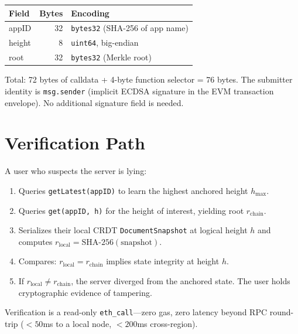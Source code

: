 \documentclass[11pt,a4paper]{article}
\begin{document}
\begin{center}
\begin{tabular}{lrl}
\toprule
\textbf{Field} & \textbf{Bytes} & \textbf{Encoding} \\
\midrule
appID  & 32 & \texttt{bytes32} (SHA-256 of app name) \\
height & 8  & \texttt{uint64}, big-endian \\
root   & 32 & \texttt{bytes32} (Merkle root) \\
\bottomrule
\end{tabular}
\end{center}

\noindent
Total: 72 bytes of calldata + 4-byte function selector = 76 bytes.
The submitter identity is \texttt{msg.sender} (implicit ECDSA signature
in the EVM transaction envelope). No additional signature field is needed.

\section{Verification Path}
\label{sec:verification}

A user who suspects the server is lying:

\begin{enumerate}[nosep]
  \item Queries \texttt{getLatest(appID)} to learn the highest anchored
        height $h_{\max}$.
  \item Queries \texttt{get(appID, h)} for the height of interest, yielding
        root $r_{\text{chain}}$.
  \item Serializes their local CRDT \texttt{DocumentSnapshot} at logical
        height $h$ and computes $r_{\text{local}} = \text{SHA-256}(\text{snapshot})$.
  \item Compares: $r_{\text{local}} = r_{\text{chain}}$ implies state
        integrity at height $h$.
  \item If $r_{\text{local}} \neq r_{\text{chain}}$, the server diverged
        from the anchored state. The user holds cryptographic evidence
        of tampering.
\end{enumerate}

\noindent
Verification is a read-only \texttt{eth\_call}---zero gas, zero latency
beyond RPC round-trip ($<50$ms to a local node, $<200$ms cross-region).

\end{document}
